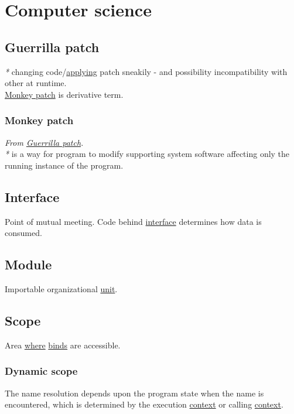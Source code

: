 \documentclass[a4paper,14pt,oneside]{book}
\begin{document}
\chapter{Computer science}
\label{sec:orgd6888ac}
\section{\label{org645d56f}Guerrilla patch}
\label{sec:org58e83a2}
\emph{*} changing code/\hyperref[org2613141]{applying} patch sneakily - and possibility incompatibility with other at runtime.\\
\hyperref[org6e7aaec]{Monkey patch} is derivative term.\\

\subsection{\label{org6e7aaec}Monkey patch}
\label{sec:orgc607357}
\emph{From \hyperref[org645d56f]{Guerrilla patch}.}\\

\emph{*} is a way for program to modify supporting system software affecting only the running instance of the program.\\

\section{\label{org313ba8f}Interface}
\label{sec:org1a21c8f}
Point of mutual meeting. Code behind \hyperref[org313ba8f]{interface} determines how data is consumed.\\

\section{\label{org15711e0}Module}
\label{sec:orgde59815}
Importable organizational \hyperref[org7580d7d]{unit}.\\

\section{\label{orgc03275b}Scope}
\label{sec:orgdaa6d5d}
Area \hyperref[org95b6103]{where} \hyperref[org9a41a27]{binds} are accessible.\\

\subsection{\label{org4e0d9af}Dynamic scope}
\label{sec:org700125f}
The name resolution depends upon the program state when the name is encountered, which is determined by the execution \hyperref[org5afd675]{context} or calling \hyperref[org5afd675]{context}.\\
\end{document}
